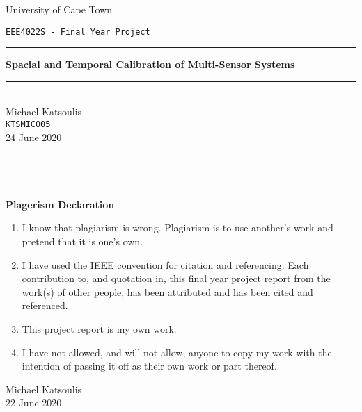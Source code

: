 \documentclass[12pt]{article}
\begin{document}
\begin{titlepage}
    \setlength{\parindent}{0pt}
    \setlength{\parskip}{0pt}
    \begin{center}
        \vspace{-4cm}
        \huge University of Cape Town
    \end{center}
    \vspace{2.5cm}
    \begin{flushleft}
        \large \texttt{EEE4022S - Final Year Project}\\[8pt]
    \end{flushleft}

    \rule{\linewidth}{0.5pt}
    \begin{center}
    \vspace{10pt}
    \huge \textbf{Spacial and Temporal Calibration of Multi-Sensor Systems}\\[5pt]
    \rule{\linewidth}{0.5pt} \\[25pt]
    \LARGE Michael Katsoulis\\[5pt]
    \large \texttt{KTSMIC005} \\[1cm]
    24 June 2020\\ %
    \rule{5cm}{0.5pt}\\[-5pt]
    \rule{2.7cm}{0.5pt}
    \end{center}
    \Large{ \textbf{Plagerism Declaration}}

    \hrulefill
    \normalsize
    \begin{enumerate}
        \item I  know that  plagiarism is wrong. Plagiarism  is  to use  another's  work  and  pretend that  it is one's own.
        \item I  have  used  the IEEE convention  for  citation  and  referencing.  Each  contribution  to,  and quotation  in,  this final  year  project  report from  the  work(s)  of  other  people,  has  been attributed and has been cited and referenced.
        \item This project report is my own work.
        \item I have not allowed, and will not allow, anyone to copy my work with the intention of passing it off as their own work or part thereof.
    \end{enumerate}
    \begin{flushright}
        Michael Katsoulis\\
        22 June 2020
    \end{flushright}
    \hrulefill
\end{titlepage}
\end{document}
